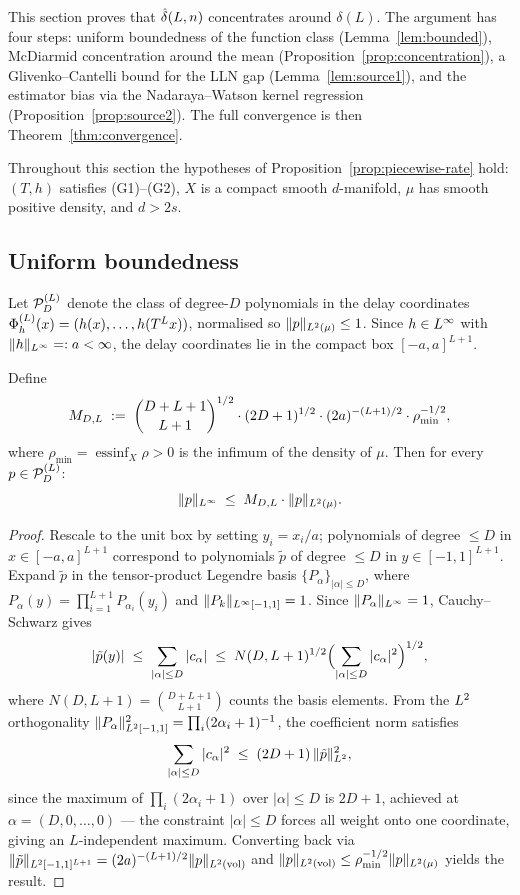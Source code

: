 This section proves that $\hat{\delta}(L,n)$ concentrates around $\delta(L)$.
The argument has four steps: uniform boundedness of the function class
(Lemma~\ref{lem:bounded}), McDiarmid concentration around the mean
(Proposition~\ref{prop:concentration}), a Glivenko--Cantelli bound for
the LLN gap (Lemma~\ref{lem:source1}), and the estimator bias via the
Nadaraya--Watson kernel regression (Proposition~\ref{prop:source2}).
The full convergence is then Theorem~\ref{thm:convergence}.

Throughout this section the hypotheses of
Proposition~\ref{prop:piecewise-rate}
hold: $(T,h)$ satisfies (G1)--(G2), $X$ is a compact smooth $d$-manifold,
$\mu$ has smooth positive density, and $d > 2s$.

\subsection{Uniform boundedness}
\label{subsec:bounded}

Let $\mathcal{P}_D^{(L)}$ denote the class of degree-$D$ polynomials in the delay coordinates
$\Phi_h^{(L)}(x) = (h(x),\ldots,h(T^L x))$, normalised so $\|p\|_{L^{2}(\mu)} \leq 1$.
Since $h \in L^{\infty}$ with $\|h\|_{L^{\infty}} =: a < \infty$, the delay
coordinates lie in the compact box $[-a,a]^{L+1}$.

\begin{lemma}
\label{lem:bounded}
Define
\[
  M_{D,L} \;:=\;
  \binom{D+L+1}{L+1}^{1/2}
  \cdot (2D+1)^{1/2}
  \cdot (2a)^{-(L+1)/2}
  \cdot \rho_{\min}^{-1/2},
\]
where $\rho_{\min} = \operatorname{essinf}_X \rho > 0$ is the infimum of
the density of $\mu$.
Then for every $p \in \mathcal{P}_D^{(L)}$:
\[
  \|p\|_{L^{\infty}} \;\leq\; M_{D,L} \cdot \|p\|_{L^{2}(\mu)}.
\]
\end{lemma}

\begin{proof}
Rescale to the unit box by setting $y_i = x_i/a$; polynomials of degree
$\leq D$ in $x \in [-a,a]^{L+1}$ correspond to polynomials $\tilde{p}$ of
degree $\leq D$ in $y \in [-1,1]^{L+1}$.
Expand $\tilde{p}$ in the tensor-product Legendre basis
$\{P_\alpha\}_{|\alpha|\leq D}$, where
$P_\alpha(y) = \prod_{i=1}^{L+1} P_{\alpha_i}(y_i)$ and $\|P_k\|_{L^{\infty}[-1,1]} = 1$.
Since $\|P_\alpha\|_{L^{\infty}} = 1$, Cauchy--Schwarz gives
\[
  |\tilde{p}(y)|
  \;\leq\; \sum_{|\alpha|\leq D} |c_\alpha|
  \;\leq\; N(D,L+1)^{1/2} \Bigl(\sum_{|\alpha|\leq D}|c_\alpha|^2\Bigr)^{1/2},
\]
where $N(D,L+1) = \binom{D+L+1}{L+1}$ counts the basis elements.
From the $L^{2}$ orthogonality
$\|P_\alpha\|_{L^{2}[-1,1]}^2 = \prod_i (2\alpha_i+1)^{-1}$,
the coefficient norm satisfies
\[
  \sum_{|\alpha|\leq D}|c_\alpha|^2
  \;\leq\; (2D+1)\,\|\tilde{p}\|_{L^{2}}^2,
\]
since the maximum of $\prod_i(2\alpha_i+1)$ over $|\alpha|\leq D$ is
$2D+1$, achieved at $\alpha=(D,0,\ldots,0)$ — the constraint $|\alpha|\leq D$
forces all weight onto one coordinate, giving an $L$-independent maximum.
Converting back via $\|\tilde{p}\|_{L^{2}[-1,1]^{L+1}}
= (2a)^{-(L+1)/2}\|p\|_{L^{2}(\mathrm{vol})}$ and
$\|p\|_{L^{2}(\mathrm{vol})} \leq \rho_{\min}^{-1/2}\|p\|_{L^{2}(\mu)}$
yields the result.
\end{proof}

